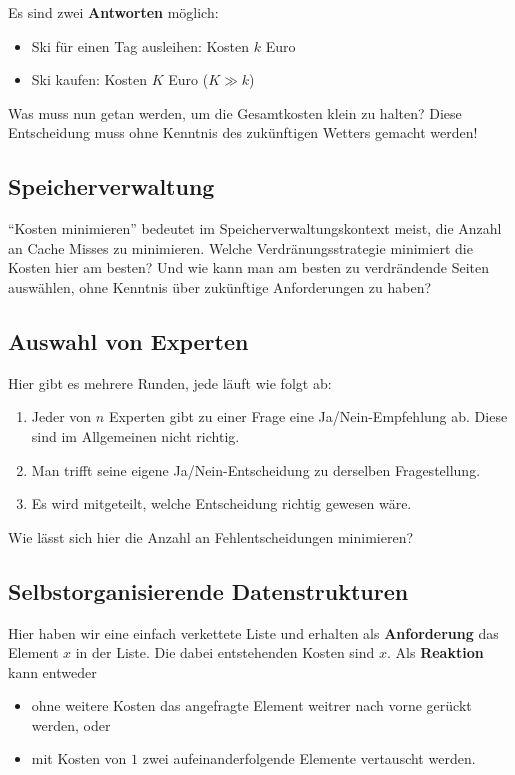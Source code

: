 Es sind zwei \textbf{Antworten} möglich:
\begin{itemize}
  \item Ski für einen Tag ausleihen: Kosten \( k \) Euro
  \item Ski kaufen: Kosten \( K \) Euro (\( K \gg k \))
\end{itemize}

Was muss nun getan werden, um die Gesamtkosten klein zu halten? Diese Entscheidung muss ohne Kenntnis des zukünftigen Wetters gemacht werden!

\subsection{Speicherverwaltung}

``Kosten minimieren'' bedeutet im Speicherverwaltungskontext meist, die Anzahl an Cache Misses zu minimieren. Welche Verdränungsstrategie minimiert die Kosten hier am besten? Und wie kann man am besten zu verdrändende Seiten auswählen, ohne Kenntnis über zukünftige Anforderungen zu haben?

\subsection{Auswahl von Experten}

Hier gibt es mehrere Runden, jede läuft wie folgt ab:
\begin{enumerate}
  \item Jeder von \( n \) Experten gibt zu einer Frage eine Ja/Nein-Empfehlung ab. Diese sind im Allgemeinen nicht richtig.
  \item Man trifft seine eigene Ja/Nein-Entscheidung zu derselben Fragestellung.
  \item Es wird mitgeteilt, welche Entscheidung richtig gewesen wäre.
\end{enumerate}

Wie lässt sich hier die Anzahl an Fehlentscheidungen minimieren?

\subsection{Selbstorganisierende Datenstrukturen}

Hier haben wir eine einfach verkettete Liste und erhalten als \textbf{Anforderung} das Element \( x \) in der Liste. Die dabei entstehenden Kosten sind \( x \). Als \textbf{Reaktion} kann entweder
\begin{itemize}
  \item ohne weitere Kosten das angefragte Element weitrer nach vorne gerückt werden, oder
  \item mit Kosten von \( 1 \) zwei aufeinanderfolgende Elemente vertauscht werden.
\end{itemize}

